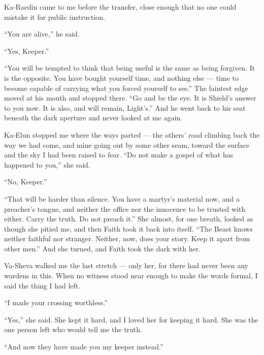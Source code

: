 Ka-Raedin came to me before the transfer, close enough that no one could mistake it for public instruction.\par

``You are alive,'' he said.\par

``Yes, Keeper.''\par

``You will be tempted to think that being useful is the same as being forgiven. It is the opposite. You have bought yourself time, and nothing else --- time to become capable of carrying what you forced yourself to see.'' The faintest edge moved at his mouth and stopped there. ``Go and be the eye. It is Shield's answer to you now. It is also, and will remain, Light's.'' And he went back to his seat beneath the dark aperture and never looked at me again.\par

Ka-Elun stopped me where the ways parted --- the others' road climbing back the way we had come, and mine going out by some other seam, toward the surface and the sky I had been raised to fear. ``Do not make a gospel of what has happened to you,'' she said.\par

``No, Keeper.''\par

``That will be harder than silence. You have a martyr's material now, and a preacher's tongue, and neither the office nor the innocence to be trusted with either. Carry the truth. Do not preach it.'' She almost, for one breath, looked as though she pitied me, and then Faith took it back into itself. ``The Beast knows neither faithful nor stranger. Neither, now, does your story. Keep it apart from other men.'' And she turned, and Faith took the dark with her.\par

Va-Sheva walked me the last stretch --- only her, for there had never been any wardens in this. When no witness stood near enough to make the words formal, I said the thing I had left.\par

``I made your crossing worthless.''\par

``Yes,'' she said. She kept it hard, and I loved her for keeping it hard. She was the one person left who would tell me the truth.\par

``And now they have made you my keeper instead.''\par

